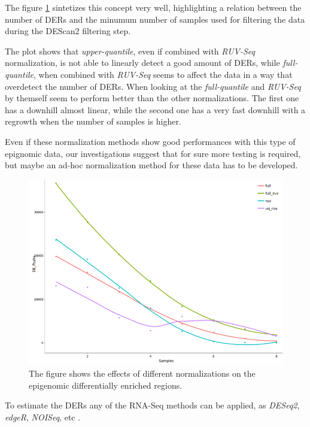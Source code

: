 The figure \ref{fig:normalizationsdescan} sintetizes this concept very well, highlighting a relation between the number of DERs and the minumum number of samples used for filtering the data during the DEScan2 filtering step.

The plot shows that \textit{upper-quantile}, even if combined with \textit{RUV-Seq} normalization, is not able to linearly detect a good amount of DERs, while \textit{full-quantile}, when combined with \textit{RUV-Seq} seems to affect the data in a way that overdetect the number of DERs. 
When looking at the \textit{full-quantile} and \textit{RUV-Seq} by themself seem to perform better than the other normalizations. The first one has a downhill almost linear, while the second one has a very fast downhill with a regrowth when the number of samples is higher.

Even if these normalization methods show good performances with this type of epignomic data, our investigations suggest that for sure more testing is required, but maybe an ad-hoc normalization method for these data has to be developed.

\begin{figure}[H]
\centering
\includegraphics[width=\textwidth, height=\textheight, keepaspectratio]{img/descan2/normalizations.png}
\caption[Normalizations applied to detected regions]{The figure shows the effects of different normalizations on the epigenomic differentially enriched regions.}
\label{fig:normalizationsdescan}
\centering
\end{figure}

To estimate the DERs any of the RNA-Seq methods can be applied, as \textit{DESeq2}, \textit{edgeR}, \textit{NOISeq}, etc \cite{Robinson2009, McCarthy2012, Tarazona2012}.


